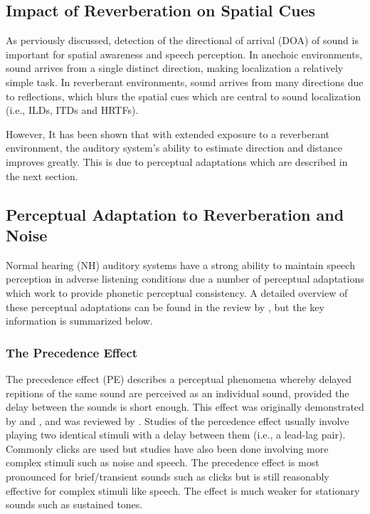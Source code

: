 \subsection{Impact of Reverberation on Spatial Cues}

As perviously discussed, detection of the directional of arrival (DOA) of sound is important for spatial awareness and speech perception. In anechoic environments, sound arrives from a single distinct direction, making localization a relatively simple task. In reverberant environments, sound arrives from many directions due to reflections, which blurs the spatial cues which are central to sound localization (i.e., ILDs, ITDs and HRTFs).

However, It has been shown that with extended exposure to a reverberant environment, the auditory system's ability to estimate direction and distance improves greatly. This is due to perceptual adaptations which are described in the next section.

\subsection{Perceptual Adaptation to Reverberation and Noise} \label{perceptual_adaptations}

Normal hearing (NH) auditory systems have a strong ability to maintain speech perception in adverse listening conditions due a number of perceptual adaptations which work to provide phonetic perceptual consistency. A detailed overview of these perceptual adaptations can be found in the review by \cite{tsironis2024adaptation}, but the key information is summarized below.

\subsubsection{The Precedence Effect}

The precedence effect (PE) describes a perceptual phenomena whereby delayed repitions of the same sound are perceived as an individual sound, provided the delay between the sounds is short enough. This effect was originally demonstrated by \cite{wallach1949precedence} and \cite{haas1951einflubeta}, and was reviewed by \cite{litovsky1999precedence}. Studies of the percedence effect usually involve playing two identical stimuli with a delay between them (i.e., a lead-lag pair). Commonly clicks are used but studies have also been done involving more complex stimuli such as noise and speech. The precedence effect is most pronounced for brief/transient sounds such as clicks but is still reasonably effective for complex stimuli like speech. The effect is much weaker for stationary sounds such as sustained tones. 

